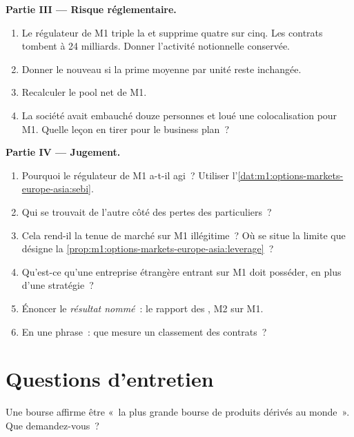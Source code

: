\begin{problem}
\medskip\noindent\textbf{Partie III --- Risque réglementaire.}
\begin{enumerate}[resume]
\item Le régulateur de M1 triple la  et supprime quatre  sur cinq. Les contrats tombent à 24 milliards. Donner l'activité notionnelle conservée.
\item Donner le nouveau  si la prime moyenne par unité reste
inchangée.
\item Recalculer le pool net de M1.
\item La société avait embauché douze personnes et loué une colocalisation pour
M1. Quelle leçon en tirer pour le business plan~?
\end{enumerate}

\medskip\noindent\textbf{Partie IV --- Jugement.}
\begin{enumerate}[resume]
\item Pourquoi le régulateur de M1 a-t-il agi~? Utiliser
l'\cref{dat:m1:options-markets-europe-asia:sebi}.
\item Qui se trouvait de l'autre côté des pertes des particuliers~?
\item Cela rend-il la tenue de marché sur M1 illégitime~? Où se situe la limite
que désigne la \cref{prop:m1:options-markets-europe-asia:leverage}~?
\item Qu'est-ce qu'une entreprise étrangère entrant sur M1 doit posséder, en plus d'une stratégie~?
\item Énoncer le \emph{résultat nommé}~: le rapport des , M2 sur M1.
\item En une phrase~: que mesure un classement des contrats~?
\end{enumerate}
\end{problem}

\section{Questions d'entretien}

\begin{interviewq}\label{iq:m1:options-markets-europe-asia:1}
Une bourse affirme être «~la plus grande bourse de produits dérivés au monde~». Que
demandez-vous~?
\end{interviewq}


